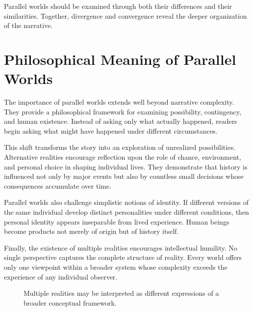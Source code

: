 \documentclass[12pt,oneside,openany]{book}
\begin{document}
\begin{tcolorbox}[colback=yellow!8,colframe=orange!70!black,title=Analytical Reflection]
Parallel worlds should be examined through both their differences and their
similarities. Together, divergence and convergence reveal the deeper
organization of the narrative.
\end{tcolorbox}

\section{Philosophical Meaning of Parallel Worlds}

The importance of parallel worlds extends well beyond narrative complexity.
They provide a philosophical framework for examining possibility, contingency,
and human existence. Instead of asking only what actually happened, readers
begin asking what might have happened under different circumstances.

This shift transforms the story into an exploration of unrealized
possibilities. Alternative realities encourage reflection upon the role of
chance, environment, and personal choice in shaping individual lives. They
demonstrate that history is influenced not only by major events but also by
countless small decisions whose consequences accumulate over time.

Parallel worlds also challenge simplistic notions of identity. If different
versions of the same individual develop distinct personalities under different
conditions, then personal identity appears inseparable from lived experience.
Human beings become products not merely of origin but of history itself.

Finally, the existence of multiple realities encourages intellectual humility.
No single perspective captures the complete structure of reality. Every world
offers only one viewpoint within a broader system whose complexity exceeds the
experience of any individual observer.

\begin{figure}[H]
\centering
{}

\caption{Multiple realities may be interpreted as different expressions of a broader conceptual framework.}
\end{figure}
\end{document}
